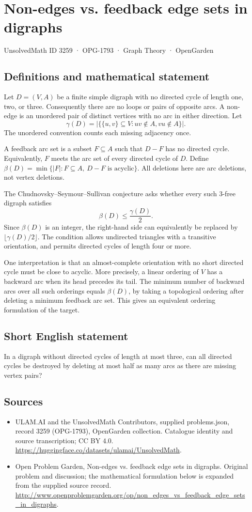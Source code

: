 \documentclass[11pt,a4paper]{article}
\begin{document}
\section*{Non-edges vs. feedback edge sets in digraphs}\label{3259}
{\small UnsolvedMath ID 3259 · OPG-1793 · Graph Theory · OpenGarden}
\subsection{Definitions and mathematical statement}
Let $D=(V,A)$ be a finite simple digraph with no directed cycle of length
one, two, or three. Consequently there are no loops or pairs of opposite
arcs. A non-edge is an unordered pair of distinct vertices with no arc
in either direction. Let
\[
 \gamma(D)=\bigl|\{\{u,v\}\subseteq V:uv\notin A, vu\notin A\}\bigr|.
\]
The unordered convention counts each missing adjacency once.

A feedback arc set is a subset $F\subseteq A$ such that $D-F$ has no
directed cycle. Equivalently, $F$ meets the arc set of every directed
cycle of $D$. Define
$\beta(D)=\min\{|F|:F\subseteq A,\ D-F\text{ is acyclic}\}$.
All deletions here are arc deletions, not vertex deletions.

The Chudnovsky--Seymour--Sullivan conjecture asks whether every such
3-free digraph satisfies
\[
                        \beta(D)\le\frac{\gamma(D)}2.
\]
Since $\beta(D)$ is an integer, the right-hand side can equivalently be
replaced by $\lfloor\gamma(D)/2\rfloor$. The condition allows undirected
triangles with a transitive orientation, and permits directed cycles
of length four or more.

One interpretation is that an almost-complete orientation with no short
directed cycle must be close to acyclic. More precisely, a linear ordering
of $V$ has a backward arc when its head precedes its tail. The minimum
number of backward arcs over all such orderings equals $\beta(D)$,
by taking a topological ordering after deleting a minimum feedback
arc set. This gives an equivalent ordering formulation of the target.
\subsection{Short English statement}
In a digraph without directed cycles of length at most three, can all directed cycles be destroyed by deleting at most half as many arcs as there are missing vertex pairs?
\subsection{Sources}
\begin{itemize}
\item[S1] ULAM.AI and the UnsolvedMath Contributors, supplied problems.json, record 3259 (OPG-1793), OpenGarden collection. Catalogue identity and source transcription; CC BY 4.0.
\url{https://huggingface.co/datasets/ulamai/UnsolvedMath}.
\item[S2] Open Problem Garden, Non-edges vs. feedback edge sets in digraphs. Original problem and discussion; the mathematical formulation below is expanded from the supplied source record.
\url{http://www.openproblemgarden.org/op/non_edges_vs_feedback_edge_sets_in_digraphs}.
\end{itemize}
\end{document}
